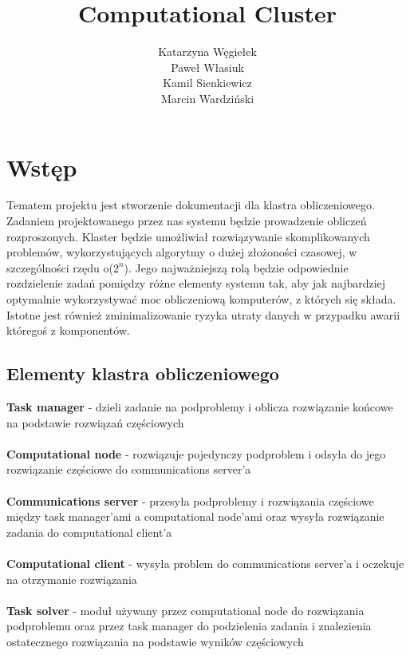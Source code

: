 \documentclass[12pt,a4paper,titlepage]{report}
\author{Katarzyna Węgiełek \\ Paweł Własiuk \\ Kamil Sienkiewicz\\ Marcin Wardziński}
\title{\textbf{Computational Cluster}}
\begin{document}
	\maketitle
	\tableofcontents
	
	\chapter{Wstęp}
	Tematem projektu jest stworzenie dokumentacji dla klastra obliczeniowego. Zadaniem projektowanego przez nas systemu będzie prowadzenie obliczeń rozproszonych. Klaster będzie umożliwiał rozwiązywanie skomplikowanych problemów, wykorzystujących algorytmy o dużej złożoności czasowej, w szczególności rzędu o($2^n$). Jego najważniejszą rolą będzie odpowiednie rozdzielenie zadań pomiędzy różne elementy systemu tak, aby jak najbardziej optymalnie wykorzystywać moc obliczeniową komputerów, z których się składa. Istotne jest również zminimalizowanie ryzyka utraty danych w przypadku awarii któregoś z komponentów.
	
	\section{Elementy klastra obliczeniowego}
	\textbf{Task manager} - dzieli zadanie na podproblemy i oblicza rozwiązanie końcowe na podstawie rozwiązań częściowych\\\\
\textbf{Computational node} - rozwiązuje pojedynczy podproblem i odsyła do jego rozwiązanie częściowe do communications server'a\\\\
\textbf{Communications server} - przesyła podproblemy i rozwiązania częściowe między task manager'ami a computational node'ami oraz wysyła rozwiązanie zadania do computational client'a\\\\
\textbf{Computational client} - wysyła problem do communications server'a i oczekuje na otrzymanie rozwiązania\\\\
\textbf{Task solver} - moduł używany przez computational node do rozwiązania podproblemu oraz przez task manager do podzielenia zadania i znalezienia ostatecznego rozwiązania na podstawie wyników częściowych\\
	
\end{document}
